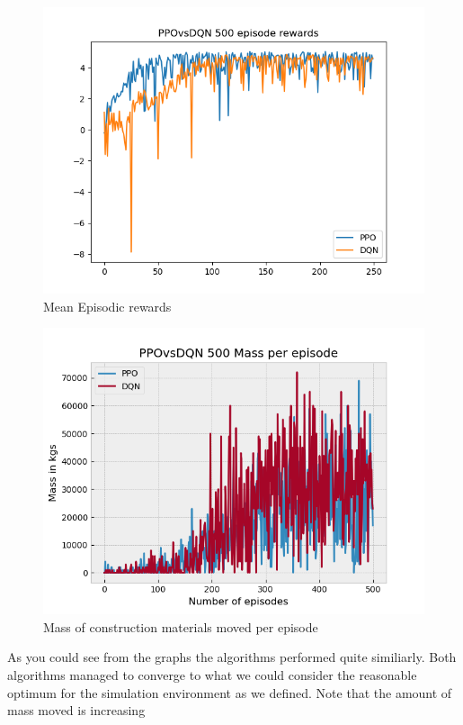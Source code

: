 \documentclass[conference]{IEEEtran}
\begin{document}
	\begin{figure}[h!]
		\includegraphics[width=\columnwidth]{graphs/PPOvsDQN250.png}
		\caption{Mean Episodic rewards}
	\end{figure}
	\begin{figure}[h!]
		\includegraphics[width=\columnwidth]{graphs/PPOvsDQN500mass.png}
		\caption{Mass of construction materials moved per episode}
	\end{figure}

	As you could see from the graphs the algorithms performed quite similiarly.
	Both algorithms managed to converge to what we could consider the reasonable optimum for the simulation
	environment as we defined. Note that the amount of mass moved is increasing
\end{document}
